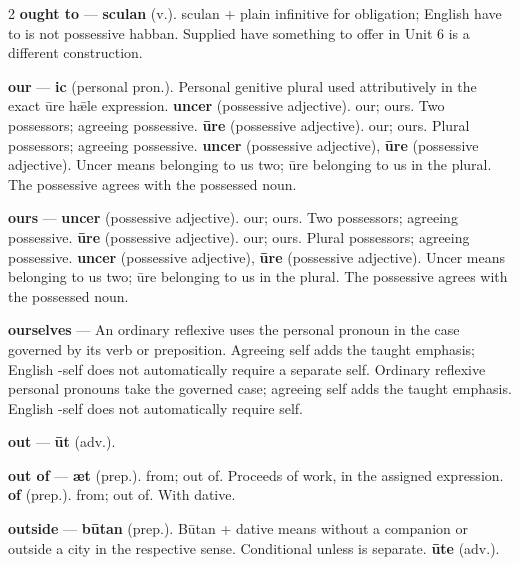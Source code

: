 \begin{multicols}{2}
\textbf{ought to} — \textbf{sculan} (v.). sculan + plain infinitive for obligation; English have to is not possessive habban. Supplied have something to offer in Unit 6 is a different construction.\par
\textbf{our} — \textbf{ic} (personal pron.). Personal genitive plural used attributively in the exact ūre hǣle expression. \textbf{uncer} (possessive adjective). our; ours. Two possessors; agreeing possessive. \textbf{ūre} (possessive adjective). our; ours. Plural possessors; agreeing possessive. \textbf{uncer} (possessive adjective), \textbf{ūre} (possessive adjective). Uncer means belonging to us two; ūre belonging to us in the plural. The possessive agrees with the possessed noun.\par
\textbf{ours} — \textbf{uncer} (possessive adjective). our; ours. Two possessors; agreeing possessive. \textbf{ūre} (possessive adjective). our; ours. Plural possessors; agreeing possessive. \textbf{uncer} (possessive adjective), \textbf{ūre} (possessive adjective). Uncer means belonging to us two; ūre belonging to us in the plural. The possessive agrees with the possessed noun.\par
\textbf{ourselves} — An ordinary reflexive uses the personal pronoun in the case governed by its verb or preposition. Agreeing self adds the taught emphasis; English -self does not automatically require a separate self. Ordinary reflexive personal pronouns take the governed case; agreeing self adds the taught emphasis. English -self does not automatically require self.\par
\textbf{out} — \textbf{ūt} (adv.).\par
\textbf{out of} — \textbf{æt} (prep.). from; out of. Proceeds of work, in the assigned expression. \textbf{of} (prep.). from; out of. With dative.\par
\textbf{outside} — \textbf{būtan} (prep.). Būtan + dative means without a companion or outside a city in the respective sense. Conditional unless is separate. \textbf{ūte} (adv.).\par

\end{multicols}
